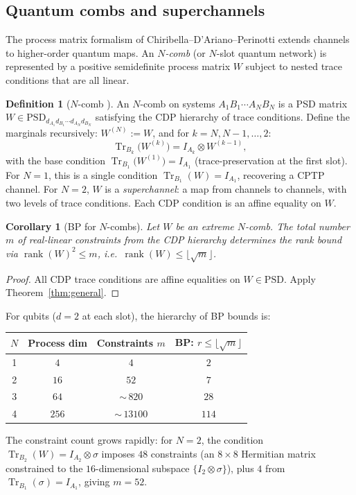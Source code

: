 \documentclass[11pt,a4paper]{article}
\newtheorem{corollary}[theorem]{Corollary}
\theoremstyle{definition}
\newtheorem{definition}[theorem]{Definition}
\newcommand{\rank}{\operatorname{rank}}
\newcommand{\PSD}{\mathrm{PSD}}
\newcommand{\Tr}{\operatorname{Tr}}
\begin{document}
\subsection{Quantum combs and superchannels}
\label{sec:combs}

The process matrix formalism of Chiribella--D'Ariano--Perinotti
\cite{cdp08, cdp09} extends channels to higher-order quantum maps.
An \emph{$N$-comb} (or $N$-slot quantum network) is represented by a
positive semidefinite process matrix $W$ subject to nested trace
conditions that are all linear.

\begin{definition}[$N$-comb {\cite{cdp08, cdp09}}]
An $N$-comb on systems $A_1 B_1 \cdots A_N B_N$ is a PSD matrix
$W \in \PSD_{d_{A_1} d_{B_1} \cdots d_{A_N} d_{B_N}}$ satisfying the
CDP hierarchy of trace conditions.  Define the marginals recursively:
$W^{(N)} := W$, and for $k = N, N{-}1, \ldots, 2$:
\[
  \Tr_{B_k}\bigl(W^{(k)}\bigr) = I_{A_k} \otimes W^{(k-1)},
\]
with the base condition $\Tr_{B_1}\bigl(W^{(1)}\bigr) = I_{A_1}$
(trace-preservation at the first slot).
For $N = 1$, this is a single condition $\Tr_{B_1}(W) = I_{A_1}$,
recovering a CPTP channel.
For $N = 2$, $W$ is a \emph{superchannel}: a map from channels to
channels, with two levels of trace conditions.
Each CDP condition is an affine equality on $W$.
\end{definition}

\begin{corollary}[BP for $N$-combs]\label{cor:combs}
Let $W$ be an extreme $N$-comb.  The total number $m$ of real-linear
constraints from the CDP hierarchy determines the rank bound via
$\rank(W)^2 \leq m$, i.e.\ $\rank(W) \leq \lfloor\sqrt{m}\rfloor$.
\end{corollary}

\begin{proof}
All CDP trace conditions are affine equalities on $W \in \PSD$.
Apply Theorem~\ref{thm:general}.
\end{proof}

For qubits ($d = 2$ at each slot), the hierarchy of BP bounds is:

\medskip
\begin{center}
\begin{tabular}{cccc}
\toprule
$N$ & Process dim & Constraints $m$ & BP: $r \leq \lfloor\sqrt{m}\rfloor$ \\
\midrule
1 & $4$     & $4$    & $2$ \\
2 & $16$    & $52$   & $7$ \\
3 & $64$    & ${\sim}\, 820$  & $28$ \\
4 & $256$   & ${\sim}\, 13100$ & $114$ \\
\bottomrule
\end{tabular}
\end{center}
\noindent
The constraint count grows rapidly: for $N = 2$, the condition
$\Tr_{B_2}(W) = I_{A_2} \otimes \sigma$ imposes $48$ constraints
(an $8 \times 8$ Hermitian matrix constrained to the $16$-dimensional
subspace $\{I_2 \otimes \sigma\}$), plus $4$ from
$\Tr_{B_1}(\sigma) = I_{A_1}$, giving $m = 52$.
\end{document}
